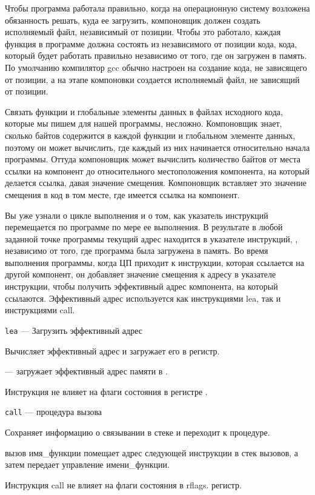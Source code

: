 Чтобы программа работала правильно, когда на операционную систему возложена обязанность решать, куда ее загрузить, компоновщик должен создать исполняемый файл, независимый от позиции. Чтобы это работало, каждая функция в программе должна состоять из независимого от позиции кода, кода, который будет работать правильно независимо от того, где он загружен в память. По умолчанию компилятор gcc обычно настроен на создание кода, не зависящего от позиции, а на этапе компоновки создается исполняемый файл, не зависящий от позиции.

Связать функции и глобальные элементы данных в файлах исходного кода, которые мы пишем для нашей программы, несложно. Компоновщик знает, сколько байтов содержится в каждой функции и глобальном элементе данных, поэтому он может вычислить, где каждый из них начинается относительно начала программы. Оттуда компоновщик может вычислить количество байтов от места ссылки на компонент до относительного местоположения компонента, на который делается ссылка, давая значение смещения. Компоновщик вставляет это значение смещения в код в том месте, где имеется ссылка на компонент.

Вы уже узнали о цикле выполнения и о том, как указатель инструкций перемещается по программе по мере ее выполнения. В результате в любой заданной точке программы текущий адрес находится в указателе инструкций, , независимо от того, где программа была загружена в память. Во время выполнения программы, когда ЦП приходит к инструкции, которая ссылается на другой компонент, он добавляет значение смещения к адресу в указателе инструкции, чтобы получить эффективный адрес компонента, на который ссылаются. Эффективный адрес используется как инструкциями lea, так и инструкциями call.

\verb|lea| --- Загрузить эффективный адрес

Вычисляет эффективный адрес и загружает его в регистр.

 --- загружает эффективный адрес памяти в .

Инструкция  не влияет на флаги состояния в регистре .

\verb|call| — процедура вызова

Сохраняет информацию о связывании в стеке и переходит к процедуре.

вызов имя\_функции помещает адрес следующей инструкции в стек вызовов, а затем передает управление имени\_функции.

Инструкция call не влияет на флаги состояния в rflags.
регистр.

